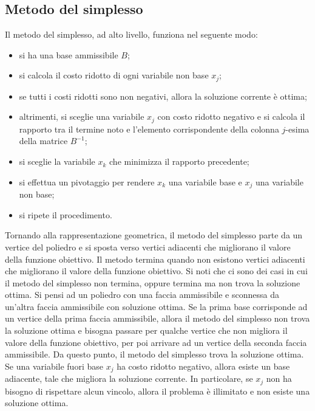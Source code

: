 \documentclass[12pt]{article}
\begin{document}
\subsection{Metodo del simplesso}

Il metodo del simplesso, ad alto livello, funziona nel seguente modo:
\begin{itemize}
	\item si ha una base ammissibile $B$;
	\item si calcola il costo ridotto di ogni variabile non base $x_j$;
	\item se tutti i costi ridotti sono non negativi, allora la soluzione
	      corrente è ottima;
	\item altrimenti, si sceglie una variabile $x_j$ con costo ridotto
	      negativo e si calcola il rapporto tra il termine noto e l'elemento
	      corrispondente della colonna $j$-esima della matrice $B^{-1}$;
	\item si sceglie la variabile $x_k$ che minimizza il rapporto precedente;
	\item si effettua un pivotaggio per rendere $x_k$ una variabile base e
	      $x_j$ una variabile non base;
	\item si ripete il procedimento.
\end{itemize}

Tornando alla rappresentazione geometrica, il metodo del simplesso parte da un
vertice del poliedro e si sposta verso vertici adiacenti che migliorano il
valore della funzione obiettivo. Il metodo termina quando non esistono vertici
adiacenti che migliorano il valore della funzione obiettivo. Si noti che ci sono
dei casi in cui il metodo del simplesso non termina, oppure termina ma non
trova la soluzione ottima. Si pensi ad un poliedro con una faccia ammissibile e
sconnessa da un'altra faccia ammissibile con soluzione ottima. Se la prima base
corrisponde ad un vertice della prima faccia ammissibile, allora il metodo del
simplesso non trova la soluzione ottima e bisogna passare per qualche vertice
che non migliora il valore della funzione obiettivo, per poi arrivare ad un
vertice della seconda faccia ammissibile. Da questo punto, il metodo del
simplesso trova la soluzione ottima.\\

Se una variabile fuori base $x_j$ ha costo ridotto negativo, allora esiste un
base adiacente, tale che migliora la soluzione corrente. In particolare, se
$x_j$ non ha bisogno di rispettare alcun vincolo, allora il problema è
illimitato e non esiste una soluzione ottima.\\
\end{document}
